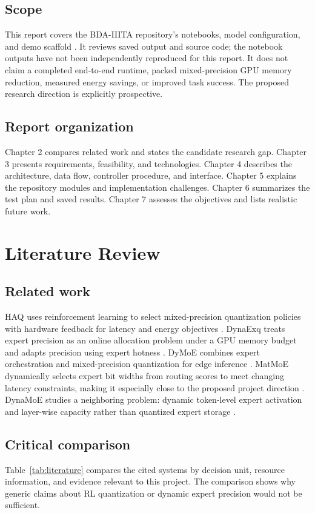 \documentclass[12pt,a4paper]{report}
\begin{document}
\section{Scope}
This report covers the BDA-IIITA repository's notebooks, model configuration, and demo scaffold \citep{adaptiveRepo,olmoeConfig}. It reviews saved output and source code; the notebook outputs have not been independently reproduced for this report. It does not claim a completed end-to-end runtime, packed mixed-precision GPU memory reduction, measured energy savings, or improved task success. The proposed research direction is explicitly prospective.

\section{Report organization}
Chapter 2 compares related work and states the candidate research gap. Chapter 3 presents requirements, feasibility, and technologies. Chapter 4 describes the architecture, data flow, controller procedure, and interface. Chapter 5 explains the repository modules and implementation challenges. Chapter 6 summarizes the test plan and saved results. Chapter 7 assesses the objectives and lists realistic future work.

\chapter{Literature Review}
\section{Related work}
HAQ uses reinforcement learning to select mixed-precision quantization policies with hardware feedback for latency and energy objectives \citep{wang2019haq}. DynaExq treats expert precision as an online allocation problem under a GPU memory budget and adapts precision using expert hotness \citep{chu2025dynaexq}. DyMoE combines expert orchestration and mixed-precision quantization for edge inference \citep{huang2026dymoe}. MatMoE dynamically selects expert bit widths from routing scores to meet changing latency constraints, making it especially close to the proposed project direction \citep{wei2026matmoe}. DynaMoE studies a neighboring problem: dynamic token-level expert activation and layer-wise capacity rather than quantized expert storage \citep{gulmez2026dynamoe}.

\section{Critical comparison}
Table~\ref{tab:literature} compares the cited systems by decision unit, resource information, and evidence relevant to this project. The comparison shows why generic claims about RL quantization or dynamic expert precision would not be sufficient.
\end{document}
